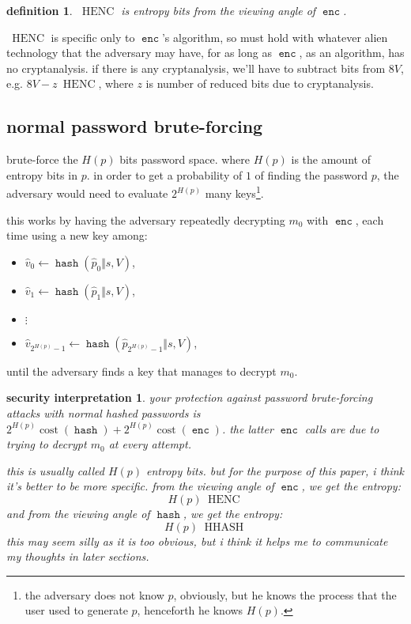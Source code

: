 \documentclass[twocolumn]{article}
\newtheorem{security}{security interpretation}
\newtheorem{definition}{definition}
\DeclareMathOperator{\enc}{\mathtt{enc}}
\DeclareMathOperator{\hash}{\mathtt{hash}}
\DeclareMathOperator{\cost}{cost}
\DeclareMathOperator{\henc}{\; HENC}
\DeclareMathOperator{\hhash}{\; HHASH}
\begin{document}
\begin{definition}
$\henc$ is entropy bits from the viewing angle of $\enc$.
\end{definition}

$\henc$  is specific only to $\enc$'s algorithm, so must hold with whatever
alien technology that the adversary may have, for as long as $\enc$, as an
algorithm, has no cryptanalysis.  if there is any cryptanalysis, we'll have
to subtract bits from $8V$, e.g. $8V
- z \henc$, where $z$ is number of reduced bits due to cryptanalysis.

\subsection{normal password brute-forcing}
brute-force the $H(p)$ bits password space.  where $H(p)$ is the amount of
entropy bits in $p$.  in order to get a probability of $1$ of finding the
password $p$, the adversary would need to evaluate $2^{H(p)}$ many
keys\footnote{the adversary does not know $p$, obviously, but he knows the
process that the user used to generate $p$, henceforth he knows $H(p)$.}.

this works by having the adversary repeatedly decrypting $m_0$ with $\enc$,
each time using a new key among:
\begin{itemize}
    \item $\hat v_0 \gets \hash(\hat p_0 \Vert s, V)$,
    \item $\hat v_1 \gets \hash(\hat p_1 \Vert s, V)$,
    \item $\vdots$
    \item $\hat v_{2^{H(p)}-1} \gets \hash(\hat p_{2^{H(p)}-1} \Vert s,
    V)$,
\end{itemize}
until the adversary finds a key that manages to decrypt $m_0$.

\begin{security}
your protection against password brute-forcing attacks with normal hashed
passwords is $2^{H(p)} \cost(\hash) + 2^{H(p)} \cost(\enc)$.  the latter
$\enc$ calls are due to trying to decrypt $m_0$ at every attempt.

this is usually called $H(p)$ \emph{entropy bits}.  but for the purpose of
this paper, i think it's better to be more specific.  from the viewing
angle of $\enc$, we get the entropy:
\[
    H(p) \henc
\]
and from the viewing angle of $\hash$, we get the entropy:
\[
    H(p) \hhash
\]
this may seem silly as it is too obvious, but i think it helps me to
communicate my thoughts in later sections.
\end{security}
\end{document}
